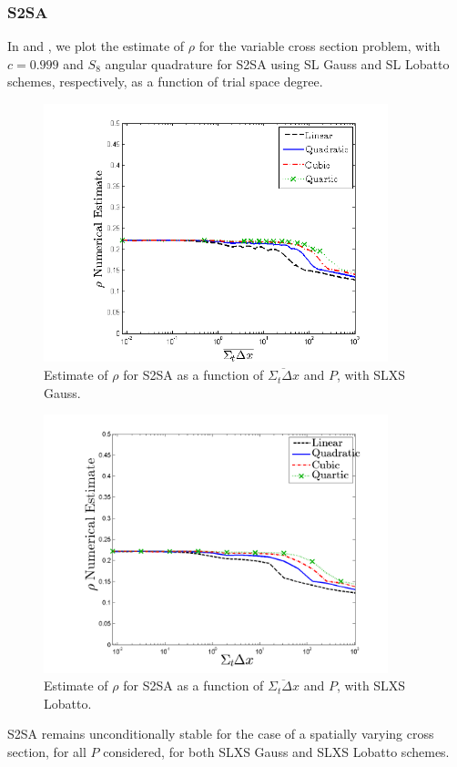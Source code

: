 \subsubsection{S2SA}

In  and , we plot the estimate of $\rho$ for the variable cross section problem, with $c=0.999$ and $S_8$ angular quadrature for S2SA using SL Gauss and SL Lobatto schemes, respectively, as a function of trial space degree.
\begin{figure}[!htp]
\centering
\includegraphics[width=10cm]{chapter4_acceleration/Variable_XS_S2SA_Gauss_spr.png}
\caption{Estimate of $\rho$ for S2SA as a function of $\overline{\Sigma_t \Delta x}$ and $P$, with SLXS Gauss.}
\label{fig:varxs_s2sa_gauss}
\end{figure}
%
%
\begin{figure}[!htp]
\centering
\includegraphics[width=10cm]{chapter4_acceleration/Variable_XS_S2SA_Lobatto_spr.png}
\caption{Estimate of $\rho$ for S2SA as a function of $\overline{\Sigma_t \Delta x}$ and $P$, with SLXS Lobatto.}
\label{fig:varxs_s2sa_lobatto}
\end{figure}
S2SA remains unconditionally stable for the case of a spatially varying cross section, for all $P$ considered, for both SLXS Gauss and SLXS Lobatto schemes.

